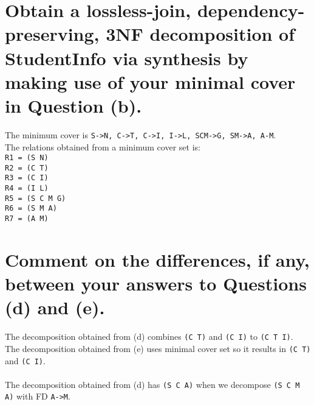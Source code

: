 \documentclass{article}
\begin{document}
\section{Obtain a lossless-join, dependency-preserving, 3NF decomposition of StudentInfo via
synthesis by making use of your minimal cover in Question (b).}
The minimum cover is \texttt{S->N, C->T, C->I, I->L, SCM->G, SM->A, A-M}.\\
The relations obtained from a minimum cover set is:\\
\texttt{R1 = (S N)}\\
\texttt{R2 = (C T)}\\
\texttt{R3 = (C I)}\\
\texttt{R4 = (I L)}\\
\texttt{R5 = (S C M G)}\\
\texttt{R6 = (S M A)}\\
\texttt{R7 = (A M)}\\



\section{Comment on the differences, if any, between your answers to Questions (d) and (e).}
The decomposition obtained from (d) combines \texttt{(C T)} and \texttt{(C I)} to \texttt{(C T I)}.\\
The decomposition obtained from (e) uses minimal cover set so it results in \texttt{(C T)} and \texttt{(C I)}.\\
\\
The decomposition obtained from (d) has \texttt{(S C A)} when we decompose \texttt{(S C M A)} with FD \texttt{A->M}.\\
\end{document}

